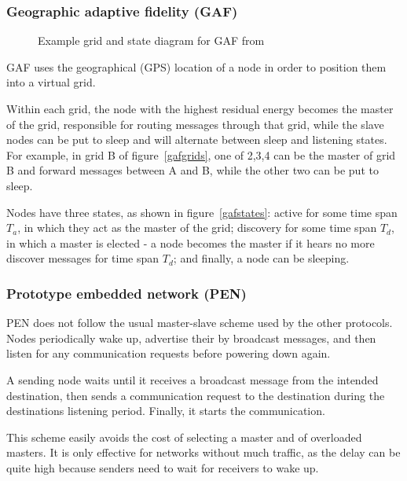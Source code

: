 \subsubsection{Geographic adaptive fidelity (GAF)}
\begin{figure}[!t]
\hfill
{}
\caption{Example grid and state diagram for GAF from \cite{alotaibi2012survey}}
\end{figure}
GAF\cite{xu2001geography} uses the geographical (GPS) location of a node in
order to position them into a virtual grid.

Within each grid, the node with the highest residual energy becomes the master
of the grid, responsible for routing messages through that grid, while the
slave nodes can be put to sleep and will alternate between sleep and listening
states. For example, in grid B of figure~\ref{gafgrids}, one of 2,3,4 can be the
master of grid B and forward messages between A and B, while the other two can
be put to sleep.

Nodes have three states, as shown in figure~\ref{gafstates}: active for some time span $T_{a}$, in which they
act as the master of the grid; discovery for some time span $T_{d}$, in which a
master is elected - a node becomes the master if it hears no more discover messages
for time span $T_{d}$; and finally, a node can be sleeping.


\subsubsection{Prototype embedded network (PEN)}
PEN\cite{girling2000design} does not follow the usual master-slave scheme
used by the other protocols. Nodes periodically wake up, advertise their
by broadcast messages, and then listen for any communication requests before
powering down again.

A sending node waits until it receives a broadcast message from the intended
destination, then sends a communication request to the destination during
the destinations listening period. Finally, it starts the communication.

This scheme easily avoids the cost of selecting a master and of overloaded
masters. It is only effective for networks without much traffic, as the delay
can be quite high because senders need to wait for receivers to wake up.
